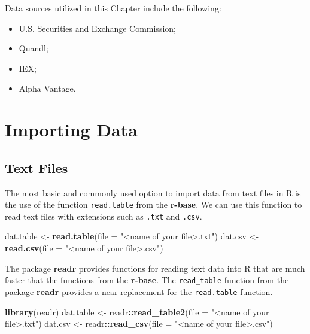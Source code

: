 \documentclass[]{book}
\newenvironment{Shaded}{\begin{snugshade}}{\end{snugshade}}
\newcommand{\KeywordTok}[1]{\textcolor[rgb]{0.13,0.29,0.53}{\textbf{#1}}}
\newcommand{\DataTypeTok}[1]{\textcolor[rgb]{0.13,0.29,0.53}{#1}}
\newcommand{\StringTok}[1]{\textcolor[rgb]{0.31,0.60,0.02}{#1}}
\newcommand{\OperatorTok}[1]{\textcolor[rgb]{0.81,0.36,0.00}{\textbf{#1}}}
\newcommand{\NormalTok}[1]{#1}
\providecommand{\tightlist}{%
  \setlength{\itemsep}{0pt}\setlength{\parskip}{0pt}}
\theoremstyle{definition}
\theoremstyle{definition}
\theoremstyle{definition}
\theoremstyle{remark}
\begin{document}
Data sources utilized in this Chapter include the following:

\begin{itemize}
\tightlist
\item
  U.S. Securities and Exchange Commission;
\item
  Quandl;
\item
  IEX;
\item
  Alpha Vantage.
\end{itemize}

\section{Importing Data}\label{importing-data}

\subsection{Text Files}\label{text-files}

The most basic and commonly used option to import data from text files
in R is the use of the function \texttt{read.table} from the
\textbf{r-base}. We can use this function to read text files with
extensions such as \texttt{.txt} and \texttt{.csv}.

\begin{Shaded}
\begin{Highlighting}[]
\NormalTok{dat.table <-}\StringTok{ }\KeywordTok{read.table}\NormalTok{(}\DataTypeTok{file =} \StringTok{"<name of your file>.txt"}\NormalTok{)}
\NormalTok{dat.csv <-}\StringTok{ }\KeywordTok{read.csv}\NormalTok{(}\DataTypeTok{file =} \StringTok{"<name of your file>.csv"}\NormalTok{)}
\end{Highlighting}
\end{Shaded}

The package \textbf{readr} provides functions for reading text data into
R that are much faster that the functions from the \textbf{r-base}. The
\texttt{read\_table} function from the package \textbf{readr} provides a
near-replacement for the \texttt{read.table} function.

\begin{Shaded}
\begin{Highlighting}[]
\KeywordTok{library}\NormalTok{(readr)}
\NormalTok{dat.table <-}\StringTok{ }\NormalTok{readr}\OperatorTok{::}\KeywordTok{read_table2}\NormalTok{(}\DataTypeTok{file =} \StringTok{"<name of your file>.txt"}\NormalTok{)}
\NormalTok{dat.csv <-}\StringTok{ }\NormalTok{readr}\OperatorTok{::}\KeywordTok{read_csv}\NormalTok{(}\DataTypeTok{file =} \StringTok{"<name of your file>.csv"}\NormalTok{)}
\end{Highlighting}
\end{Shaded}
\end{document}
